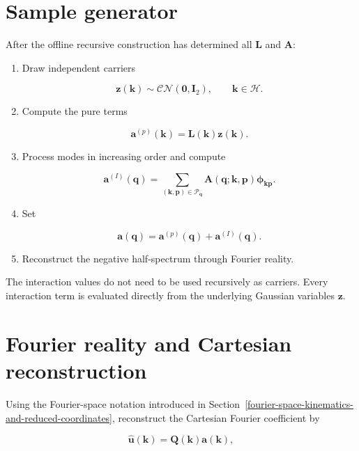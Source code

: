 \documentclass[
  11pt,
  a4paper,
]{article}
\begin{document}
\section{Sample generator}\label{sample-generator}

After the offline recursive construction has determined all
\(\boldsymbol L\) and \(\boldsymbol A\):

\begin{enumerate}
\def\labelenumi{\arabic{enumi}.}
\item
  Draw independent carriers

  \[
  \boldsymbol z(\boldsymbol k)
  \sim\mathcal{CN}(\boldsymbol0,\boldsymbol I_2),
  \qquad
  \boldsymbol k\in\mathcal H.
  \]
\item
  Compute the pure terms

  \[
  \boldsymbol a^{(p)}(\boldsymbol k)
  =
  \boldsymbol L(\boldsymbol k)\boldsymbol z(\boldsymbol k).
  \]
\item
  Process modes in increasing order and compute

  \[
  \boldsymbol a^{(I)}(\boldsymbol q)
  =
  \sum_{(\boldsymbol k,\boldsymbol p)\in\mathcal P_{\boldsymbol q}}
  \boldsymbol A(\boldsymbol q;\boldsymbol k,\boldsymbol p)
  \boldsymbol\phi_{\boldsymbol k\boldsymbol p}.
  \]
\item
  Set

  \[
  \boldsymbol a(\boldsymbol q)
  =
  \boldsymbol a^{(p)}(\boldsymbol q)
  +
  \boldsymbol a^{(I)}(\boldsymbol q).
  \]
\item
  Reconstruct the negative half-spectrum through Fourier reality.
\end{enumerate}

The interaction values do not need to be used recursively as carriers.
Every interaction term is evaluated directly from the underlying
Gaussian variables \(\boldsymbol z\).

\section{Fourier reality and Cartesian
reconstruction}\label{fourier-reality-and-cartesian-reconstruction}

Using the Fourier-space notation introduced in
Section~\ref{fourier-space-kinematics-and-reduced-coordinates}, reconstruct
the Cartesian Fourier coefficient by

\[
\widehat{\boldsymbol u}(\boldsymbol k)
=
\boldsymbol Q(\boldsymbol k)
\boldsymbol a(\boldsymbol k),
\]
\end{document}
